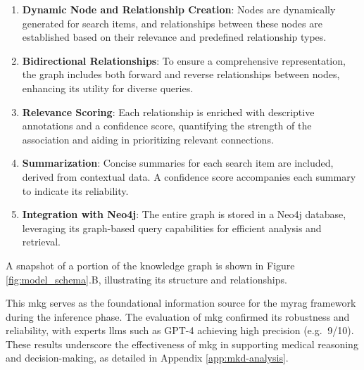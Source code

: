 \begin{enumerate}
    \item \textbf{Dynamic Node and Relationship Creation}: Nodes are dynamically generated for search items, and relationships between these nodes are established based on their relevance and predefined relationship types.
    
    \item \textbf{Bidirectional Relationships}: To ensure a comprehensive representation, the graph includes both forward and reverse relationships between nodes, enhancing its utility for diverse queries.
    
    \item \textbf{Relevance Scoring}: Each relationship is enriched with descriptive annotations and a confidence score, quantifying the strength of the association and aiding in prioritizing relevant connections.
    
    \item \textbf{Summarization}: Concise summaries for each search item are included, derived from contextual data. A confidence score accompanies each summary to indicate its reliability.
    
    \item \textbf{Integration with Neo4j}: The entire graph is stored in a Neo4j database, leveraging its graph-based query capabilities for efficient analysis and retrieval.
\end{enumerate}

A snapshot of a portion of the knowledge graph is shown in Figure \ref{fig:model_schema}.B, illustrating its structure and relationships.

This \gls{mkg} serves as the foundational information source for the \gls{myrag} framework during the inference phase. The evaluation of \gls{mkg} confirmed its robustness and reliability, with experts \glspl{llm} such as GPT-4 achieving high precision (e.g. $~$9/10). These results underscore the effectiveness of \gls{mkg} in supporting medical reasoning and decision-making, as detailed in Appendix \ref{app:mkd-analysis}.

